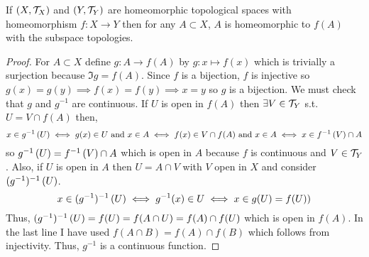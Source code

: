 \documentclass[12pt]{extarticle}
\begin{document}
\begin{lemma} \label{subsethomeo}
If $(X, \mathcal{T}_X)$ and $(Y, \mathcal{T}_Y)$ are homeomorphic topological spaces with homeomorphism $f : X \to Y$ then for any $A \subset X$, $A$ is homeomorphic to $f(A)$ with the subspace topologies.  
\end{lemma}
\begin{proof}
For $A \subset X$ define $g : A \rightarrow f(A)$ by $g : x \mapsto f(x)$ which is trivially a surjection because $\Im{g} = f(A)$. Since $f$ is a bijection, $f$ is injective so $g(x) = g(y) \implies f(x) = f(y) \implies x = y$ so $g$ is a bijection. We must check that $g$ and $g^{-1}$ are continuous. If $U$ is open in $f(A)$ then $\exists V \in \mathcal{T}_Y$ s.t. $U = V \cap f(A)$ then, \[x \in g^{-1} \left( U \right) \iff g(x) \in U \text{ and } x \in A \iff f(x) \in V \cap f(A) \text{ and } x \in A \iff x \in f^{-1} \left( V \right) \cap A\]  so $g^{-1} \left( U \right) = f^{-1} \left( V \right) \cap A$ which is open in $A$ because $f$ is continuous and $V \in \mathcal{T}_Y$. Also, if $U$ is open in $A$ then $U = A \cap V$ with $V$ open in $X$ and consider $(g^{-1})^{-1} \left( U \right)$. \[x \in (g^{-1})^{-1} \left( U \right) \iff g^{-1}(x) \in U \iff x \in g(U) = f(U))\] 
Thus, $(g^{-1})^{-1} \left( U \right) = f(U) = f(A \cap U) = f(A) \cap f(U)$ which is open in $f(A)$. In the last line I have used $f(A \cap B) = f(A) \cap f(B)$ which follows from injectivity. Thus, $g^{-1}$ is a continuous function.
\end{proof}
\end{document}
